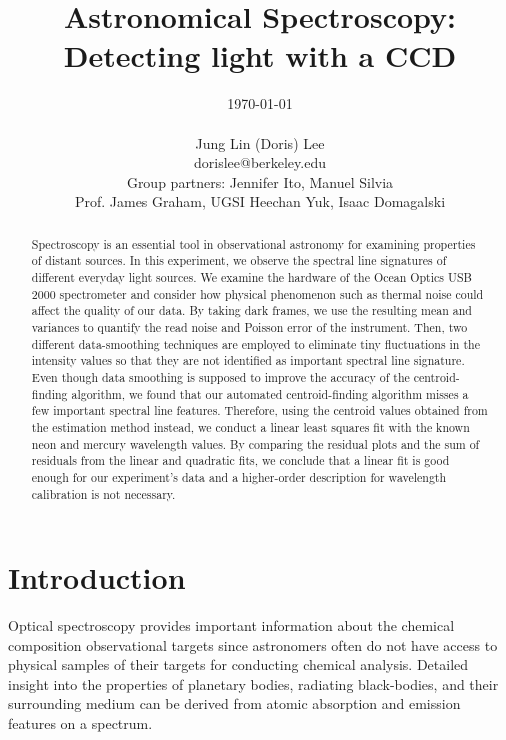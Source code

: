 \documentclass[authoryear,12pt,5p,times]{elsarticle}
\begin{document}
\begin{frontmatter}
\title{Astronomical Spectroscopy: Detecting light with a CCD}
\author{\today \\ \quad \\Jung Lin (Doris) Lee\\ dorislee@berkeley.edu\\Group partners: Jennifer Ito, Manuel Silvia\\Prof. James Graham, UGSI Heechan Yuk, Isaac Domagalski}
	\begin{abstract}
	Spectroscopy is an essential tool in observational astronomy for examining  properties of distant sources. In this experiment, we observe the spectral line signatures of different everyday light sources. We examine the hardware of the Ocean Optics USB 2000 spectrometer and consider how physical phenomenon such as thermal noise could affect the quality of our data. %
By taking dark frames, we use the resulting mean and variances to
  quantify the read noise and Poisson error of the instrument. %
Then, two different data-smoothing techniques are employed to eliminate tiny fluctuations in the intensity values %
so that they are not identified as important spectral line signature. %
Even though data smoothing is supposed to improve the accuracy of the centroid-finding algorithm, we found that our automated centroid-finding algorithm misses a few important spectral line features. Therefore, using the centroid values obtained from the estimation method instead, we conduct a linear least squares fit with the known neon and mercury wavelength values. By comparing the residual plots and the sum of residuals from the linear and quadratic fits, we conclude that a linear fit is good enough for our experiment's data and a higher-order description for wavelength calibration is not necessary. 
  
	\end{abstract}
\end{frontmatter}
\section{Introduction\label{intro}}
Optical spectroscopy provides important information about the chemical composition observational targets since astronomers often do not have access to physical samples of their targets for conducting chemical analysis. Detailed insight into the properties of planetary bodies, radiating black-bodies, and their  surrounding medium can be derived from atomic absorption and emission features on a spectrum.
\end{document}
